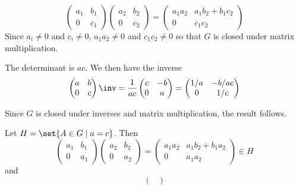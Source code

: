 \begin{solenum}
    \item 
    \[
        \begin{pmatrix}
            a_1 & b_1 \\
            0 & c_1
        \end{pmatrix}
        \begin{pmatrix}
            a_2 & b_2 \\
            0 & c_2
        \end{pmatrix} = 
        \begin{pmatrix}
            a_1a_2 & a_1b_2 + b_1c_2 \\
            0 & c_1c_2
        \end{pmatrix}
	\]
    Since $a_i \neq 0$ and $c_i \neq 0$, $a_1a_2 \neq 0$ and $c_1c_2 \neq 0$ so that $G$ is closed under matrix multiplication.
    \item The determinant is $ac$.
	We then have the inverse
    \[
        \begin{pmatrix}
            a & b \\
            0 & c
        \end{pmatrix}\inv = 
        \frac{1}{ac}
        \begin{pmatrix}
            c & -b \\
            0 & a
        \end{pmatrix} = 
        \begin{pmatrix}
            1/a & -b/ac \\
            0 & 1/c
        \end{pmatrix}
    \]
    \item Since $G$ is closed under inverses and matrix multiplication, the result follows.
    \item Let $H = \set{A \in G \mid a = c}$.
	Then
    \[
        \begin{pmatrix}
            a_1 & b_1 \\
            0 & a_1
        \end{pmatrix}
        \begin{pmatrix}
            a_2 & b_2 \\
            0 & a_2
        \end{pmatrix} = 
        \begin{pmatrix}
            a_1a_2 & a_1b_2 + b_1a_2 \\
            0 & a_1a_2
        \end{pmatrix} \in H
    \]
    and
    \[
        \begin{pmatrix}

\end{pmatrix}\]
\end{solenum}

